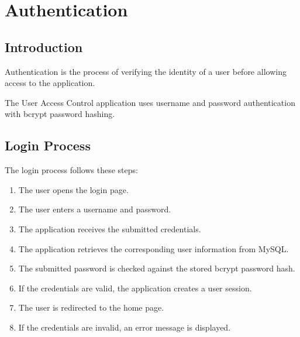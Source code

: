 \documentclass[letterpaper,10pt,english]{sphinxmanual}
\begin{document}
\sphinxstepscope


\section{Authentication}
\label{\detokenize{authentication:authentication}}\label{\detokenize{authentication::doc}}

\subsection{Introduction}
\label{\detokenize{authentication:introduction}}
\sphinxAtStartPar
Authentication is the process of verifying the identity of a user before
allowing access to the application.

\sphinxAtStartPar
The User Access Control application uses username and password authentication
with bcrypt password hashing.


\subsection{Login Process}
\label{\detokenize{authentication:login-process}}
\sphinxAtStartPar
The login process follows these steps:
\begin{enumerate}
%
\item {} 
\sphinxAtStartPar
The user opens the login page.

\item {} 
\sphinxAtStartPar
The user enters a username and password.

\item {} 
\sphinxAtStartPar
The application receives the submitted credentials.

\item {} 
\sphinxAtStartPar
The application retrieves the corresponding user information from MySQL.

\item {} 
\sphinxAtStartPar
The submitted password is checked against the stored bcrypt password hash.

\item {} 
\sphinxAtStartPar
If the credentials are valid, the application creates a user session.

\item {} 
\sphinxAtStartPar
The user is redirected to the home page.

\item {} 
\sphinxAtStartPar
If the credentials are invalid, an error message is displayed.

\end{enumerate}
\end{document}
